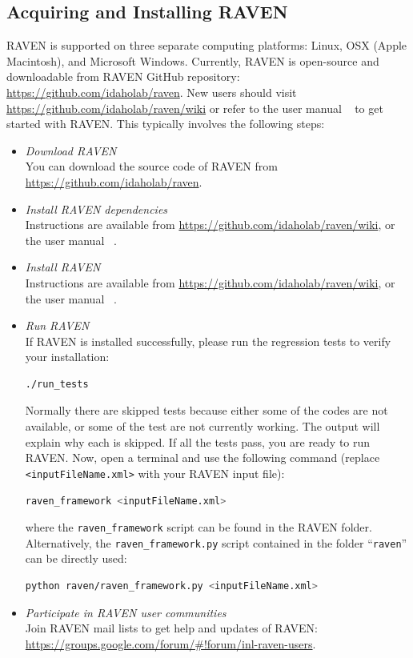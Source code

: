 \subsection{Acquiring and Installing RAVEN}
RAVEN is supported on three separate computing platforms: Linux, OSX (Apple Macintosh), and Microsoft Windows.
Currently, RAVEN is open-source and downloadable from RAVEN GitHub repository: \url{https://github.com/idaholab/raven}.
New users should visit \url{https://github.com/idaholab/raven/wiki} or refer to the user manual ~\cite{RAVENuserManual}
to get started with RAVEN. This typically involves the following steps:
\begin{itemize}
  \item \textit{Download RAVEN}
    \\ You can download the source code of RAVEN from \url{https://github.com/idaholab/raven}.
  \item \textit{Install RAVEN dependencies}
    \\ Instructions are available from \url{https://github.com/idaholab/raven/wiki}, or the user manual ~\cite{RAVENuserManual}.
  \item \textit{Install RAVEN}
    \\ Instructions are available from \url{https://github.com/idaholab/raven/wiki}, or the user manual ~\cite{RAVENuserManual}.
  \item \textit{Run RAVEN}
    \\ If RAVEN is installed successfully, please run the regression tests to verify your installation:
    \begin{lstlisting}[language=bash]
      ./run_tests
    \end{lstlisting}
    Normally there are skipped tests because either some of the codes are not available, or some of the test are not
    currently working. The output will explain why each is skipped. If all the tests pass, you are ready to run RAVEN.
    Now, open a terminal and use the following command (replace \texttt{<inputFileName.xml>} with your
    RAVEN input file):
    \begin{lstlisting}[language=bash]
      raven_framework <inputFileName.xml>
    \end{lstlisting}
    where the \texttt{raven\_framework} script can be found in the RAVEN folder. Alternatively, the \texttt{raven\_framework.py} script
    contained in the folder ``\texttt{raven}'' can be directly used:
    \begin{lstlisting}[language=bash]
      python raven/raven_framework.py <inputFileName.xml>
    \end{lstlisting}
  \item \textit{Participate in RAVEN user communities}
    \\ Join RAVEN mail lists to get help and updates of RAVEN: \url{https://groups.google.com/forum/#!forum/inl-raven-users}.
\end{itemize}


